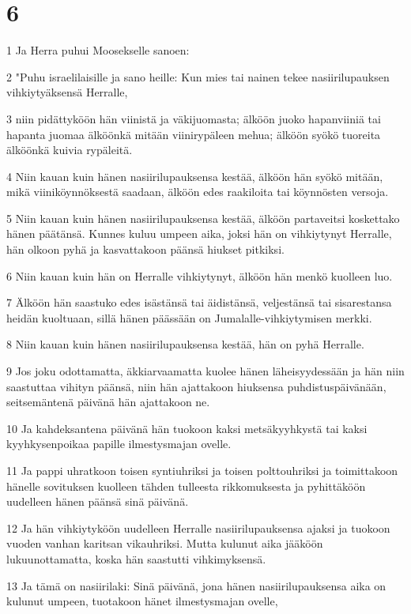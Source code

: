 \chapter{6}

\par 1 Ja Herra puhui Moosekselle sanoen:
\par 2 "Puhu israelilaisille ja sano heille: Kun mies tai nainen tekee nasiirilupauksen vihkiytyäksensä Herralle,
\par 3 niin pidättyköön hän viinistä ja väkijuomasta; älköön juoko hapanviiniä tai hapanta juomaa älköönkä mitään viinirypäleen mehua; älköön syökö tuoreita älköönkä kuivia rypäleitä.
\par 4 Niin kauan kuin hänen nasiirilupauksensa kestää, älköön hän syökö mitään, mikä viiniköynnöksestä saadaan, älköön edes raakiloita tai köynnösten versoja.
\par 5 Niin kauan kuin hänen nasiirilupauksensa kestää, älköön partaveitsi koskettako hänen päätänsä. Kunnes kuluu umpeen aika, joksi hän on vihkiytynyt Herralle, hän olkoon pyhä ja kasvattakoon päänsä hiukset pitkiksi.
\par 6 Niin kauan kuin hän on Herralle vihkiytynyt, älköön hän menkö kuolleen luo.
\par 7 Älköön hän saastuko edes isästänsä tai äidistänsä, veljestänsä tai sisarestansa heidän kuoltuaan, sillä hänen päässään on Jumalalle-vihkiytymisen merkki.
\par 8 Niin kauan kuin hänen nasiirilupauksensa kestää, hän on pyhä Herralle.
\par 9 Jos joku odottamatta, äkkiarvaamatta kuolee hänen läheisyydessään ja hän niin saastuttaa vihityn päänsä, niin hän ajattakoon hiuksensa puhdistuspäivänään, seitsemäntenä päivänä hän ajattakoon ne.
\par 10 Ja kahdeksantena päivänä hän tuokoon kaksi metsäkyyhkystä tai kaksi kyyhkysenpoikaa papille ilmestysmajan ovelle.
\par 11 Ja pappi uhratkoon toisen syntiuhriksi ja toisen polttouhriksi ja toimittakoon hänelle sovituksen kuolleen tähden tulleesta rikkomuksesta ja pyhittäköön uudelleen hänen päänsä sinä päivänä.
\par 12 Ja hän vihkiytyköön uudelleen Herralle nasiirilupauksensa ajaksi ja tuokoon vuoden vanhan karitsan vikauhriksi. Mutta kulunut aika jääköön lukuunottamatta, koska hän saastutti vihkimyksensä.
\par 13 Ja tämä on nasiirilaki: Sinä päivänä, jona hänen nasiirilupauksensa aika on kulunut umpeen, tuotakoon hänet ilmestysmajan ovelle,
